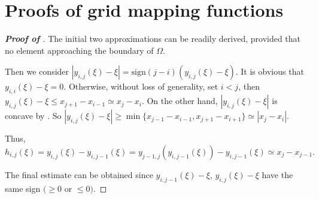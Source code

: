 \documentclass{amsart}
\theoremstyle{definition}
\theoremstyle{remark}
\numberwithin{equation}{section}
\begin{document}
\section{Proofs of grid mapping functions}
\label{sec:prfs-of-GMFs}

\begin{proof} [\bf Proof of ]
  \label{prf:gen-prop-of-MTFs}
  The initial two approximations can be readily derived, provided that no element approaching the boundary of \(\Omega\).    \par
  Then we consider $|y_{i,j}(\xi) - \xi| = \text{sign}(j-i)(y_{i,j}(\xi) - \xi)$.
  It is obvious that $y_{i,i}(\xi)-\xi = 0$. 
  Otherwise, without loss of generality, set $i< j$, then $ y_{i,j}(\xi) - \xi \le x_{j+1} - x_{i-1} \simeq x_j - x_i$.
  On the other hand, $|y_{i,j}(\xi) - \xi|$ is concave by . So $|y_{i,j}(\xi) - \xi| \ge \min\{x_{j-1}-x_{i-1}, x_{j+1}-x_{i+1}\} \simeq |x_{j} - x_{i}| $.  \par
  Thus,
  $ h_{i,j}(\xi) = y_{i,j}(\xi) - y_{i,j-1}(\xi) = y_{j-1, j}(y_{i,j-1}(\xi)) - y_{i,j-1}(\xi) \simeq x_{j} - x_{j-1}. $ \par
  The final estimate can be obtained since \(y_{i,j-1}(\xi) - \xi\), \(y_{i,j}(\xi) - \xi\) have the same sign \((\ge 0\) or \(\le 0)\).
\end{proof}
\end{document}
